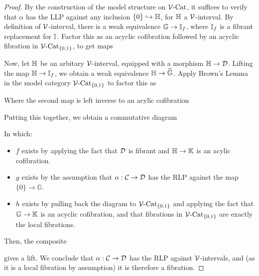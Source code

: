 \documentclass[12pt]{amsart}
\renewcommand{\tilde}{\widetilde}
\begin{document}
\begin{proof}
	By the construction of the model structure on $\mathcal{V}\text{-}\mathrm{Cat}$, it suffices to verify that $\alpha$ has the LLP against any inclusion $\{0\} \hookrightarrow \mathbb{H}$, for $\mathbb{H}$ a $\mathcal{V}$-interval. 
	By definition of $\mathcal{V}$-interval, there is a weak equivalence $\mathbb{G} \to \mathbb{I}_f$, where $\mathbb{I}_f$ is a fibrant replacement for $\mathbb{I}$. Factor this as an acyclic cofibration followed by an acyclic fibration in $\mathcal{V}\text{-}\mathrm{Cat}_{\{0,1\}}$, to get maps 
	Now, let $\mathbb{H}$ be an arbitary $\mathcal{V}$-interval, equipped with a morphism $\mathbb{H} \to \mathcal{D}$.
	Lifting the map $\mathbb{H} \to \mathbb{I}_f$, we obtain a weak equivalence $\H \to \tilde{\mathbb{G}}$. 
	Apply Brown's Lemma in the model category $\mathcal{V}\text{-}\mathrm{Cat}_{\{0,1\}}$ to factor this as 
	Where the second map is left inverse to an acylic cofibration 
	Putting this together, we obtain a commutative diagram
	\begin{center}
	\end{center}
	In which:
	\begin{itemize}
		\item $f$ exists by applying the fact that $\mathcal{D}$ is fibrant and $\mathbb{H} \to \mathbb{K}$ is an acylic cofibration.
		\item $g$ exists by the assumption that $\alpha: \mathcal{C} \to \mathcal{D}$ has the RLP against the map $\{0\} \to \mathbb{G}$.
		\item $h$ exists by pulling back the diagram to $\mathcal{V}\text{-}\mathrm{Cat}_{\{0,1\}}$ and applying the fact that $\mathbb{G} \to \mathbb{K}$ is an acyclic cofibration, and that fibrations in $\mathcal{V}\text{-}\mathrm{Cat}_{\{0,1\}}$ are exactly the local fibrations.
	\end{itemize}
	Then, the composite 
	gives a lift. 
	We conclude that $\alpha: \mathcal{C} \to \mathcal{D}$ has the RLP against $\mathcal{V}$-intervals, and (as it is a local fibration by assumption) it is therefore a fibration.
\end{proof}
\end{document}
